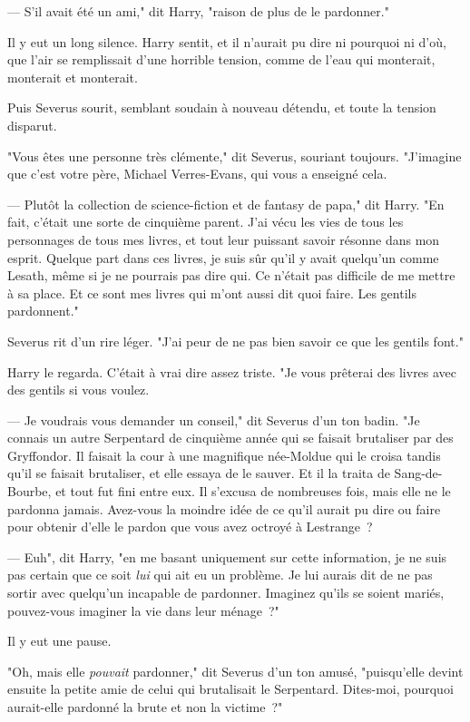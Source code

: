 --- S'il avait été un ami," dit Harry, "raison de plus de le pardonner."

Il y eut un long silence. Harry sentit, et il n'aurait pu dire ni pourquoi ni d'où, que l'air se remplissait d'une horrible tension, comme de l'eau qui monterait, monterait et monterait.

Puis Severus sourit, semblant soudain à nouveau détendu, et toute la tension disparut.

"Vous êtes une personne très clémente," dit Severus, souriant toujours. "J'imagine que c'est votre père, Michael Verres-Evans, qui vous a enseigné cela.

--- Plutôt la collection de science-fiction et de fantasy de papa," dit Harry. "En fait, c'était une sorte de cinquième parent. J'ai vécu les vies de tous les personnages de tous mes livres, et tout leur puissant savoir résonne dans mon esprit. Quelque part dans ces livres, je suis sûr qu'il y avait quelqu'un comme Lesath, même si je ne pourrais pas dire qui. Ce n'était pas difficile de me mettre à sa place. Et ce sont mes livres qui m'ont aussi dit quoi faire. Les gentils pardonnent."

Severus rit d'un rire léger. "J'ai peur de ne pas bien savoir ce que les gentils font."

Harry le regarda. C'était à vrai dire assez triste. "Je vous prêterai des livres avec des gentils si vous voulez.

--- Je voudrais vous demander un conseil," dit Severus d'un ton badin. "Je connais un autre Serpentard de cinquième année qui se faisait brutaliser par des Gryffondor. Il faisait la cour à une magnifique née-Moldue qui le croisa tandis qu'il se faisait brutaliser, et elle essaya de le sauver. Et il la traita de Sang-de-Bourbe, et tout fut fini entre eux. Il s'excusa de nombreuses fois, mais elle ne le pardonna jamais. Avez-vous la moindre idée de ce qu'il aurait pu dire ou faire pour obtenir d'elle le pardon que vous avez octroyé à Lestrange~?

--- Euh", dit Harry, "en me basant uniquement sur cette information, je ne suis pas certain que ce soit \emph{lui} qui ait eu un problème. Je lui aurais dit de ne pas sortir avec quelqu'un incapable de pardonner. Imaginez qu'ils se soient mariés, pouvez-vous imaginer la vie dans leur ménage~?"

Il y eut une pause.

"Oh, mais elle \emph{pouvait} pardonner," dit Severus d'un ton amusé, "puisqu'elle devint ensuite la petite amie de celui qui brutalisait le Serpentard. Dites-moi, pourquoi aurait-elle pardonné la brute et non la victime~?"

